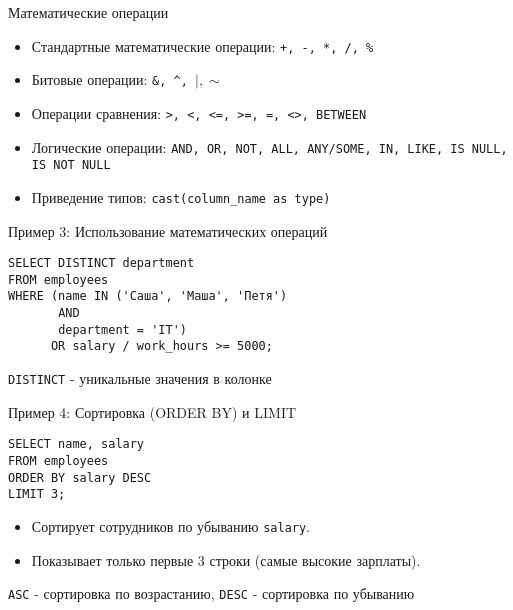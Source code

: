 \documentclass{beamer}
\begin{document}
\begin{frame}[fragile]{Математические операции}
	\begin{itemize}
		\item Стандартные математические операции: \texttt{+, -, *, /, \%}
		\item Битовые операции: \texttt{\&, \^ \;, $\vert, \sim$}
		\item Операции сравнения: \texttt{>, <, <=, >=, =, <>, BETWEEN}
		\item Логические операции: \texttt{AND, OR, NOT, ALL, ANY/SOME, IN, LIKE, IS NULL, IS NOT NULL}
		\item Приведение типов: \texttt{cast(column\_name as type)}
	\end{itemize}
\end{frame}

\begin{frame}[fragile]{Пример 3: Использование математических операций}
	\begin{verbatim}
SELECT DISTINCT department
FROM employees
WHERE (name IN ('Саша', 'Маша', 'Петя')
       AND
       department = 'IT')
      OR salary / work_hours >= 5000;
    \end{verbatim}
	\texttt{DISTINCT} - уникальные значения в колонке
\end{frame}


\begin{frame}[fragile]{Пример 4: Сортировка (ORDER BY) и LIMIT}
	\begin{verbatim}
SELECT name, salary
FROM employees
ORDER BY salary DESC
LIMIT 3;
\end{verbatim}
	\begin{itemize}
		\item Сортирует сотрудников по убыванию \texttt{salary}.
		\item Показывает только первые 3 строки (самые высокие зарплаты).
	\end{itemize}
	\texttt{ASC} - сортировка по возрастанию, \texttt{DESC} - сортировка по убыванию
\end{frame}
\end{document}
